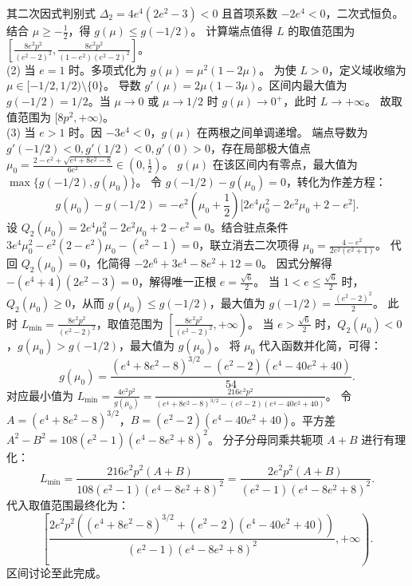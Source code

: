 \begin{solution}
其二次因式判别式 $\Delta_2 = 4e^4(2e^2-3) < 0$ 且首项系数 $-2e^4<0$，二次式恒负。结合 $\mu \ge -\frac{1}{2}$，得 $g(\mu) \le g(-1/2)$。
计算端点值得 $L$ 的取值范围为 $\left[ \frac{8e^2p^2}{(e^2-2)^2}, \frac{8e^2p^2}{(1-e^2)(e^2-2)^2} \right]$。\\
(2) 当 $e = 1$ 时。多项式化为 $g(\mu) = \mu^2(1-2\mu)$。
为使 $L > 0$，定义域收缩为 $\mu \in [-1/2, 1/2) \setminus \{0\}$。
导数 $g'(\mu) = 2\mu(1-3\mu)$。区间内最大值为 $g(-1/2) = 1/2$。当 $\mu \to 0$ 或 $\mu \to 1/2$ 时 $g(\mu) \to 0^+$，此时 $L \to +\infty$。
故取值范围为 $[8p^2, +\infty)$。\\
(3) 当 $e > 1$ 时。因 $-3e^4 < 0$，$g(\mu)$ 在两根之间单调递增。
端点导数为 $g'(-1/2) < 0, g'(1/2) < 0, g'(0) > 0$，存在局部极大值点 $\mu_0 = \frac{2-e^2 + \sqrt{e^4+8e^2-8}}{6e^2} \in \left(0, \frac{1}{2}\right)$。
$g(\mu)$ 在该区间内有零点，最大值为 $\max\{g(-1/2), g(\mu_0)\}$。
令 $g(-1/2) - g(\mu_0) = 0$，转化为作差方程：
\[ g(\mu_0) - g(-1/2) = -e^2 \left(\mu_0 + \frac{1}{2}\right) \big[ 2e^4\mu_0^2 - 2e^2\mu_0 + 2 - e^2 \big]. \]
设 $Q_2(\mu_0) = 2e^4\mu_0^2 - 2e^2\mu_0 + 2 - e^2 = 0$。结合驻点条件 $3e^4\mu_0^2 - e^2(2-e^2)\mu_0 - (e^2-1) = 0$，联立消去二次项得 $\mu_0 = \frac{4-e^2}{2e^2(e^2+1)}$。
代回 $Q_2(\mu_0) = 0$，化简得 $-2e^6 + 3e^4 - 8e^2 + 12 = 0$。
因式分解得 $-(e^4+4)(2e^2-3) = 0$，解得唯一正根 $e = \frac{\sqrt{6}}{2}$。
当 $1 < e \le \frac{\sqrt{6}}{2}$ 时，$Q_2(\mu_0) \ge 0$，从而 $g(\mu_0) \le g(-1/2)$，最大值为 $g(-1/2) = \frac{(e^2-2)^2}{2}$。
此时 $L_{\min} = \frac{8e^2 p^2}{(e^2-2)^2}$，取值范围为 $\left[ \frac{8e^2 p^2}{(e^2-2)^2}, +\infty \right)$。
当 $e > \frac{\sqrt{6}}{2}$ 时，$Q_2(\mu_0) < 0$，$g(\mu_0) > g(-1/2)$，最大值为 $g(\mu_0)$。
将 $\mu_0$ 代入函数并化简，可得：
\[ g(\mu_0) = \frac{(e^4+8e^2-8)^{3/2} - (e^2-2)(e^4-40e^2+40)}{54}. \]
对应最小值为 $L_{\min} = \frac{4e^2 p^2}{g(\mu_0)} = \frac{216e^2 p^2}{(e^4+8e^2-8)^{3/2} - (e^2-2)(e^4-40e^2+40)}$。
令 $A = (e^4+8e^2-8)^{3/2}$，$B = (e^2-2)(e^4-40e^2+40)$。平方差 $A^2 - B^2 = 108(e^2-1)(e^4-8e^2+8)^2$。
分子分母同乘共轭项 $A+B$ 进行有理化：
\[ L_{\min} = \frac{216e^2 p^2(A+B)}{108(e^2-1)(e^4-8e^2+8)^2} = \frac{2e^2 p^2(A+B)}{(e^2-1)(e^4-8e^2+8)^2}. \]
代入取值范围最终化为：
\[ \left[ \frac{2e^2 p^2\left((e^4+8e^2-8)^{3/2} + (e^2-2)(e^4-40e^2+40)\right)}{(e^2-1)(e^4-8e^2+8)^2}, +\infty \right). \]
区间讨论至此完成。
\end{solution}



